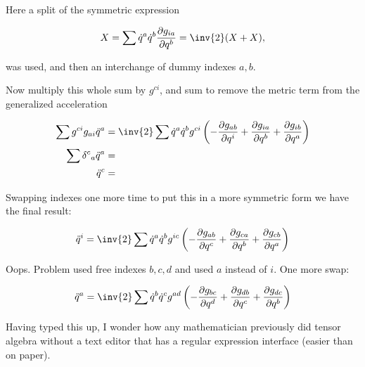\documentclass{article}
\newcommand{\LL}[0]{\mathcal{L}}
\newcommand{\qdot}[0]{\dot{q}}
\newcommand{\qddot}[0]{\ddot{q}}
\newcommand{\xdot}[0]{\dot{x}}
\newcommand{\xddot}[0]{\ddot{x}}
\newcommand{\PD}[2]{\frac{\partial {#2}}{\partial {#1}}}
\begin{document}
Here a split of the symmetric expression 

\begin{equation*}
X = \sum \qdot^a \qdot^b \PD{q^b}{g_{ia}} = \inv{2}(X + X),
\end{equation*}

was used, and then an interchange of dummy indexes $a,b$.

Now multiply this whole sum by $g^{ci}$, and sum to remove the metric term from the generalized acceleration

\begin{align*}
\sum g^{ci} g_{ai} \qddot^a &= \inv{2} \sum \qdot^a \qdot^b g^{ci} \left( - \PD{q^i}{g_{ab}} + \PD{q^b}{g_{ia}} + \PD{q^a}{g_{ib}} \right) \\
\sum {\delta^c}_a \qddot^a &= \\
\qddot^c &= \\
\end{align*}

Swapping indexes one more time to put this in a more symmetric form we have the final result:

\begin{equation*}
\qddot^i = \inv{2} \sum \qdot^a \qdot^b g^{i c} \left( - \PD{q^c}{g_{ab}} + \PD{q^b}{g_{c a}} + \PD{q^a}{g_{c b}} \right)
\end{equation*}

Oops.  Problem used free indexes $b,c,d$ and used $a$ instead of $i$.  One more swap:

\begin{equation*}
\qddot^a = \inv{2} \sum \qdot^b \qdot^c g^{a d} \left( - \PD{q^d}{g_{b c}} + \PD{q^c}{g_{d b}} + \PD{q^b}{g_{d c}} \right)
\end{equation*}

Having typed this up, I wonder how any mathematician previously did tensor algebra without a text editor that has a regular expression interface (easier than on paper).

%
%
%
%
%
%
\end{document}
